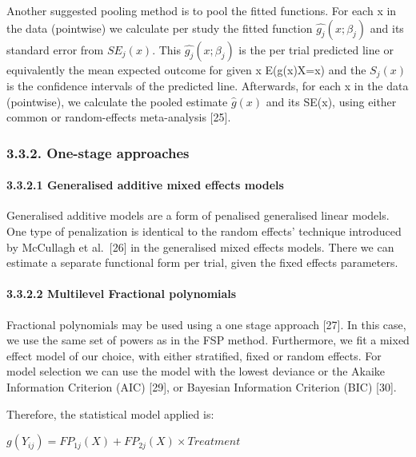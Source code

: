 \documentclass[14pt,]{article}
\let\oldparagraph\paragraph
\renewcommand{\paragraph}[1]{\oldparagraph{#1}\mbox{}}
\begin{document}
Another suggested pooling method is to pool the fitted functions. For
each x in the data (pointwise) we calculate per study the fitted
function \(\hat{g_j}(x; \beta_j)\) and its standard error from
\(SE_j(x)\). This \(\hat{g_j}(x; \beta_j)\) is the per trial predicted
line or equivalently the mean expected outcome for given x
E(g(x)\textbar X=x) and the \(S_j(x)\) is the confidence intervals of
the predicted line. Afterwards, for each x in the data (pointwise), we
calculate the pooled estimate \(\hat{g}(x)\) and its SE(x), using either
common or random-effects meta-analysis {[}25{]}.

\hypertarget{one-stage-approaches}{%
\subsubsection{3.3.2. One-stage approaches}\label{one-stage-approaches}}

\hypertarget{generalised-additive-mixed-effects-models}{%
\paragraph{3.3.2.1 Generalised additive mixed effects
models}\label{generalised-additive-mixed-effects-models}}

Generalised additive models are a form of penalised generalised linear
models. One type of penalization is identical to the random effects'
technique introduced by McCullagh et al.~{[}26{]} in the generalised
mixed effects models. There we can estimate a separate functional form
per trial, given the fixed effects parameters.

\hypertarget{multilevel-fractional-polynomials}{%
\paragraph{3.3.2.2 Multilevel Fractional
polynomials}\label{multilevel-fractional-polynomials}}

Fractional polynomials may be used using a one stage approach {[}27{]}.
In this case, we use the same set of powers as in the FSP method.
Furthermore, we fit a mixed effect model of our choice, with either
stratified, fixed or random effects. For model selection we can use the
model with the lowest deviance or the Akaike Information Criterion (AIC)
{[}29{]}, or Bayesian Information Criterion (BIC) {[}30{]}.

Therefore, the statistical model applied is:

\(g(Y_{ij}) = FP_{1j}(X) + FP_{2j}(X) \times Treatment\)
\end{document}
